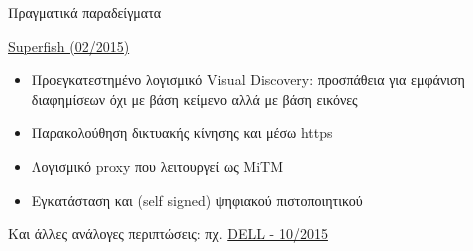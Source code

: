 \documentclass[handout]{beamer}
\begin{document}
\begin{frame}{Πραγματικά παραδείγματα}
\begin{block}{\href{https://www.schneier.com/blog/archives/2015/02/man-in-the-midd_7.html}{Superfish (02/2015)}}
	\begin{itemize}
		\item Προεγκατεστημένο λογισμικό Visual Discovery: προσπάθεια για εμφάνιση διαφημίσεων όχι με βάση κείμενο αλλά με βάση εικόνες \pause
		\item Παρακολούθηση δικτυακής κίνησης και μέσω https \pause
		\item Λογισμικό proxy που λειτουργεί ως MiTM \pause
		\item Εγκατάσταση και (self signed) ψηφιακού πιστοποιητικού \pause
	\end{itemize}
\end{block}
\pause
Και άλλες ανάλογες περιπτώσεις: πχ. \alert{\href{http://arstechnica.com/security/2015/11/dell-apologizes-for-https-certificate-fiasco-provides-removal-tool/}{DELL - 10/2015}}

\end{frame}
\end{document}
